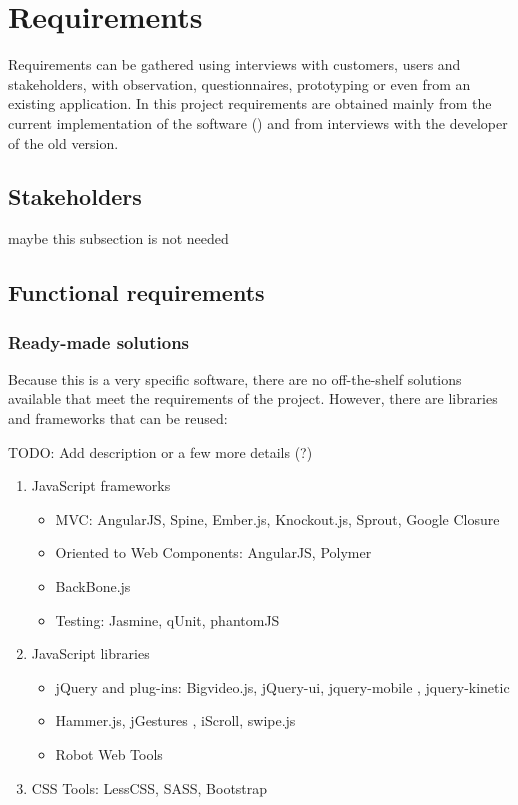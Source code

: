 \chapter{Requirements}
Requirements can be gathered using interviews with customers, users and stakeholders, with observation, questionnaires, prototyping or even from an existing application.
In this project requirements are obtained mainly from the current implementation of the software () and from interviews with the developer of the old version.

\section{Stakeholders}
maybe this subsection is not needed

\section{Functional requirements}

\subsection{Ready-made solutions}
Because this is a very specific software, there are no off-the-shelf solutions available that meet the requirements of the project.
However, there are libraries and frameworks that can be reused:

TODO: Add description or a few more details (?)

\begin{enumerate}
    \item JavaScript frameworks
    \begin{itemize}
        \item \ac{MVC}: AngularJS, Spine, Ember.js, Knockout.js, Sprout, Google Closure
        \item Oriented to Web Components: AngularJS, Polymer
        \item BackBone.js
    \item Testing: Jasmine, qUnit, phantomJS   
    \end{itemize}
    \item JavaScript libraries
    \begin{itemize}
        \item jQuery and plug-ins: Bigvideo.js, jQuery-ui, jquery-mobile , jquery-kinetic  
        \item Hammer.js, jGestures , iScroll, swipe.js
        \item Robot Web Tools
    \end{itemize} 
    \item \ac{CSS} Tools: LessCSS, SASS, Bootstrap
\end{enumerate}

